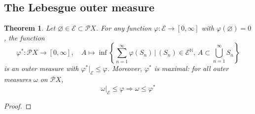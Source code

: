 \documentclass[11pt, a4paper, openany]{book}
\newtheorem{thm}{Theorem}\newtheorem{lem}{Lemma}\newtheorem{crl}{Corollary}
\theoremstyle{definition}
\newenvironment{tight_enumerate}{\begin{enumerate}\itemsep -0.2em}{\end{enumerate}}
\begin{document}
\subsection{The Lebesgue outer measure}
    \begin{thm}
        Let $\varnothing\in\mathscr{E}\subset\mathscr{P}X$. For any function $\varphi:\mathscr{E}\rightarrow [0,\infty]$ with $\varphi(\varnothing)=0$, the function
        \[
            \varphi^*:\mathscr{P}X\rightarrow [0,\infty],\quad A\mapsto\inf\left\{\sum_{n=1}^\infty \varphi(S_n)\,\bigg|\,(S_n)\in \mathscr{E}^\mathbb{N},\,A\subset \bigcup_{n=1}^\infty S_n\right\}
        \]
        is an outer measure with $\varphi^*|_\mathscr{E}\leqslant \varphi$. Moreover, $\varphi^*$ is maximal: for all outer measures $\omega$ on $\mathscr{P}X$,
        \[
            \omega|_{\mathscr{E}}\leqslant \varphi \Longrightarrow \omega\leqslant \varphi^*
        \]
    \end{thm}
    \begin{proof}
        
    \end{proof}
\end{document}
